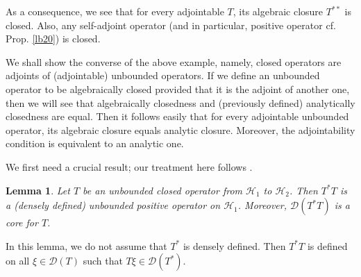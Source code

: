 \documentclass[12pt,b5paper,notitlepage]{article}
\theoremstyle{definition}
\theoremstyle{plain}
\newtheorem{lm}[df]{Lemma}
\newcommand{\mc}{\mathcal}
\newcommand{\Dom}{\scr D}
\newcommand{\scr}{\mathscr}
\numberwithin{equation}{section}
\begin{document}
As a consequence, we see that for every adjointable $T$, its algebraic closure $T^{**}$ is closed. Also, any self-adjoint operator (and in particular, positive operator cf. Prop. \ref{lb20}) is closed.



We shall show the converse of the above example, namely, closed operators are adjoints of (adjointable) unbounded operators. If we define an unbounded operator to be algebraically closed provided that it is the adjoint of another one, then we will see that algebraically closedness and (previously defined) analytically closedness are equal. Then it follows easily that for every adjointable unbounded operator, its algebraic closure equals analytic closure. Moreover, the adjointability condition is equivalent to an analytic one.


We first need a crucial result; our treatment here follows \cite[Rem. 2.7.7]{Kad}.

\begin{lm}\label{lb16}
Let $T$ be an unbounded closed operator from $\mc H_1$ to $\mc H_2$. Then $T^*T$ is a (densely defined) unbounded positive operator on $\mc H_1$. Moreover, $\Dom(T^*T)$ is a core for $T$.
\end{lm}


In this lemma, we do not assume that $T^*$ is densely defined. Then $T^*T$ is defined on all $\xi\in\Dom(T)$ such that $T\xi\in\Dom(T^*)$.
\end{document}
